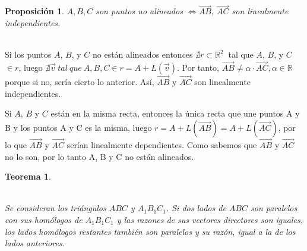\documentclass[11pt, a4paper]{article}
\makeatletter
\newif\IfInSansMode
\let\oldsf\sffamily
\renewcommand*{\sffamily}{\oldsf\mathversion{sans}\InSansModetrue}
\let\oldnorm\normalfont
\renewcommand*{\normalfont}{\oldnorm\InSansModefalse\mathversion{normal}}
\renewenvironment{proof}[1][\proofname] {\vspace{-15pt}\par\pushQED{\qed}\normalfont\topsep6\p@\@plus6\p@\relax\trivlist\item[\hskip\labelsep\it#1\@addpunct{.}]\ignorespaces}{\popQED\endtrivlist\@endpefalse}
\renewcommand{\vec}{\overrightarrow}
\renewenvironment{proof}[1][\proofname] {\par\pushQED{\qed}\normalfont\topsep6\p@\@plus6\p@\relax\trivlist\item[\hskip\labelsep\itshape\sffamily#1\@addpunct{.}]\ignorespaces}{\popQED\endtrivlist\@endpefalse}
\theoremstyle{theorem-style}
\newtheorem{nth}{Teorema}[section]
\newtheorem{nprop}{Proposición}[section]
\theoremstyle{definition-style}
\theoremstyle{remark-style}
\theoremstyle{example-style}
\makeatother
\begin{document}
\begin{nprop}
  $A,B,C$ son puntos no alineados  $ \iff \overrightarrow{AB}, \ \overrightarrow{AC}$ son linealmente independientes.
\end{nprop}

  \begin {proof}\hfill\\
    \boxed{\Rightarrow}
    Si los puntos $A$, $B$, y $C$ no están alineados entonces $\nexists r \subset \mathbb{R}^2\ $ tal que $A$, $B$, y $C$ $\in r$, luego $\nexists \vec{v}\ tal\ que\ A,B,C \in r = A + L(\vec{v})$. Por tanto, $\overrightarrow{AB} \neq \alpha \cdot \overrightarrow{AC}, \alpha \in \mathbb{R}\ $ porque si no, sería cierto lo anterior. Así, $\overrightarrow{AB}$ y $\overrightarrow{AC}$ son linealmente independientes.

    \boxed{\Leftarrow} Si $A$, $B$ y $C$ están en la misma recta, entonces la única recta que une puntos A y B y los puntos A y C es la misma, luego $r = A + L(\overrightarrow{AB})  = A + L(\overrightarrow{AC})$, por lo que $\overrightarrow{AB}$ y $\overrightarrow{AC}$ serían linealmente dependientes. Como sabemos que $\overrightarrow{AB}$ y $\overrightarrow{AC}$ no lo son, por lo tanto A, B y C no están alineados.
  \end{proof}


\begin{nth}\hfill\\
\begin{minipage}[c]{0.50\textwidth}
  \hfill\\
  Se consideran los triángulos $ABC$ y $A_1B_1C_1$. Si dos lados de $ABC$ son paralelos con sus homólogos de $A_1B_1C_1$ y las razones de sus vectores directores son iguales, los lados homólogos restantes también son paralelos y su razón, igual a la de los lados anteriores.
\end{minipage}\hfill
\begin{minipage}[]{0.47\textwidth}
\end{minipage}

  \end{nth}
\end{document}
